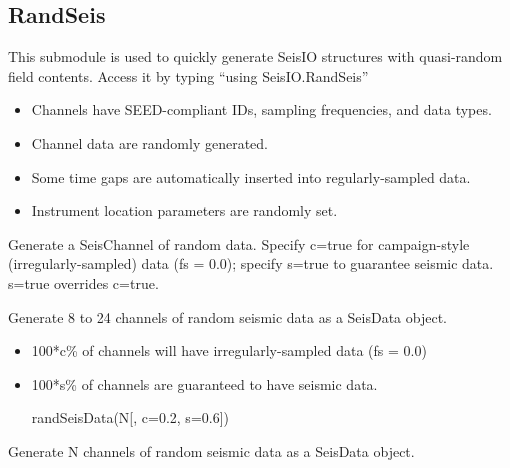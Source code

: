 \documentclass[letterpaper,11pt,english]{sphinxmanual}
\begin{document}
\subsection{RandSeis}
\label{\detokenize{src/Appendices/function_list:randseis}}
This submodule is used to quickly generate SeisIO structures with quasi-random
field contents. Access it by typing “using SeisIO.RandSeis”
\begin{itemize}
\item {} 
Channels have SEED-compliant IDs, sampling frequencies, and data types.

\item {} 
Channel data are randomly generated.

\item {} 
Some time gaps are automatically inserted into regularly-sampled data.

\item {} 
Instrument location parameters are randomly set.

\end{itemize}


\begin{fulllineitems}
\end{fulllineitems}


Generate a SeisChannel of random data. Specify c=true for campaign-style (irregularly-sampled) data (fs = 0.0); specify s=true to guarantee seismic data. s=true overrides c=true.

Generate 8 to 24 channels of random seismic data as a SeisData object.
\begin{itemize}
\item {} 
100*c\% of channels  will have irregularly-sampled data (fs = 0.0)

\item {} 
100*s\% of channels  are guaranteed to have seismic data.

randSeisData(N{[}, c=0.2, s=0.6{]})

\end{itemize}

Generate N channels of random seismic data as a SeisData object.

\begin{fulllineitems}
\label{\detokenize{src/Appendices/function_list:randSeisEvent}}
\end{fulllineitems}
\end{document}
